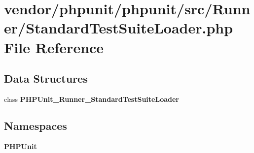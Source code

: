 \section{vendor/phpunit/phpunit/src/\+Runner/\+Standard\+Test\+Suite\+Loader.php File Reference}
\label{_standard_test_suite_loader_8php}
\subsection*{Data Structures}
\begin{DoxyCompactItemize}
\item 
class {\bf P\+H\+P\+Unit\+\_\+\+Runner\+\_\+\+Standard\+Test\+Suite\+Loader}
\end{DoxyCompactItemize}
\subsection*{Namespaces}
\begin{DoxyCompactItemize}
\item 
 {\bf P\+H\+P\+Unit}
\end{DoxyCompactItemize}
